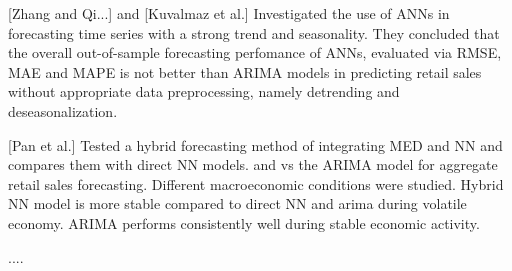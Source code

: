 [Zhang and Qi...] and [Kuvalmaz et al.]
Investigated the use of ANNs in forecasting time series with a strong trend and seasonality.
They concluded that the overall out-of-sample forecasting perfomance of ANNs, 
evaluated via RMSE, MAE and MAPE is not better than ARIMA models in predicting
retail sales without appropriate data preprocessing,
namely detrending and deseasonalization.

[Pan et al.]
Tested a hybrid forecasting method of integrating MED and NN and compares them with direct NN models.
and vs the ARIMA model for aggregate retail sales forecasting.
Different macroeconomic conditions were studied.
Hybrid NN model is more stable compared to direct NN and arima during volatile economy.
ARIMA performs consistently well during stable economic activity.


\cite{Bowen2020} ....